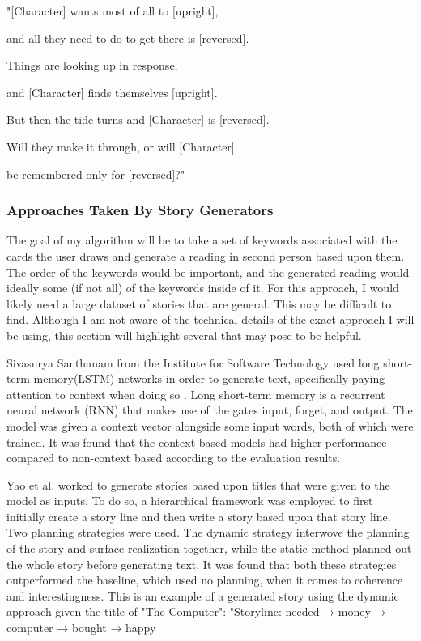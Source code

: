 \documentclass[10pt,twocolumn]{article}
\begin{document}
"[Character] wants most of all to [upright],

and all they need to do to get there is [reversed].

Things are looking up in response,

and [Character] finds themselves [upright].

But then the tide turns and [Character] is [reversed].

Will they make it through, or will [Character]

be remembered only for [reversed]?"
 
\subsubsection{Approaches Taken By Story Generators}
The goal of my algorithm will be to take a set of keywords associated with the cards the user draws and generate a reading in second person based upon them. The order of the keywords would be important, and the generated reading would ideally some (if not all) of the keywords inside of it. For this approach, I would likely need a large dataset of stories that are general. This may be difficult to find. Although I am not aware of the technical details of the exact approach I will be using, this section will highlight several that may pose to be helpful.

Sivasurya Santhanam from the Institute for Software Technology used long short-term memory(LSTM) networks in order to generate text, specifically paying attention to context when doing so \cite{Santhanam2020ContextBT}. Long short-term memory is a recurrent neural network (RNN) that makes use of the gates input, forget, and output. The model was given a context vector alongside some input words, both of which were trained. It was found that the context based models had higher performance compared to non-context based according to the evaluation results.

Yao et al.\cite{yao_peng_weischedel_knight_zhao_yan_2019} worked to generate stories based upon titles that were given to the model as inputs. To do so, a hierarchical framework was employed to first initially create a story line and then write a story based upon that story line. Two planning strategies were used. The dynamic strategy interwove the planning of the story and surface realization together, while the static method planned out the whole story before generating text. It was found that both these strategies outperformed the baseline, which used no planning, when it comes to coherence and interestingness. This is an example of a generated story using the dynamic approach given the title of "The Computer":
"Storyline: needed → money → computer → bought → happy
\end{document}
